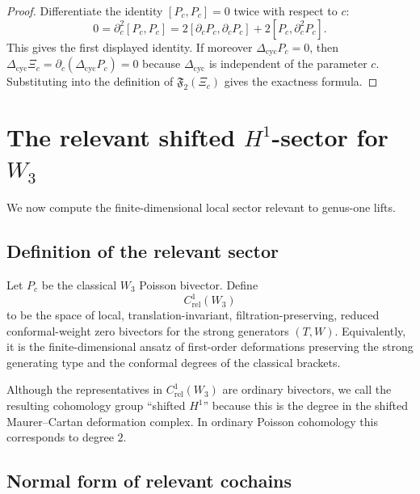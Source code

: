 \begin{proof}
Differentiate the identity $[P_c,P_c]=0$ twice with respect to $c$:
\[
0=\partial_c^2[P_c,P_c]=2[\partial_cP_c,\partial_cP_c]+2[P_c,\partial_c^2P_c].
\]
This gives the first displayed identity.  If moreover
$\Delta_{\mathrm{cyc}}P_c=0$, then $\Delta_{\mathrm{cyc}}\Xi_c=
\partial_c(\Delta_{\mathrm{cyc}}P_c)=0$ because
$\Delta_{\mathrm{cyc}}$ is independent of the parameter $c$.  Substituting
into the definition of $\mathfrak F_2(\Xi_c)$ gives the exactness formula.
\end{proof}

\section{The relevant shifted $H^1$-sector for $W_3$}

We now compute the finite-dimensional local sector relevant to genus-one lifts.

\subsection{Definition of the relevant sector}

\begin{definition}
Let $P_c$ be the classical $W_3$ Poisson bivector. Define
\[
C^1_{\mathrm{rel}}(W_3)
\]
to be the space of local, translation-invariant, filtration-preserving, reduced conformal-weight
zero bivectors for the strong generators $(T,W)$. Equivalently, it is the finite-dimensional
ansatz of first-order deformations preserving the strong generating type and the conformal
degrees of the classical brackets.
\end{definition}

\begin{remark}
Although the representatives in $C^1_{\mathrm{rel}}(W_3)$ are ordinary bivectors, we call
the resulting cohomology group ``shifted $H^1$'' because this is the degree in the shifted
Maurer--Cartan deformation complex. In ordinary Poisson cohomology this corresponds to
degree $2$.
\end{remark}

\subsection{Normal form of relevant cochains}

